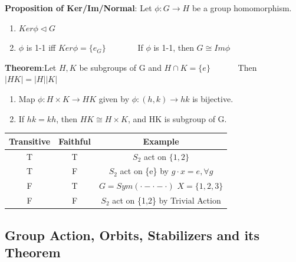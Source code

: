 \documentclass[11pt]{article}
\begin{document}
\begin{minipage}[t]{0.67\linewidth}

\textbf{Proposition of Ker/Im/Normal}: Let $\phi:G\to H$ be a group homomorphism.
\begin{enumerate}[itemsep=-2pt, topsep=-2pt]
    \item $Ker\phi\lhd G$
    \item $\phi$ is 1-1 iff $Ker\phi=\{e_G\}$ \ \ \ \ \ \ \ If $\phi$ is 1-1, then $G\cong Im\phi$
\end{enumerate}

\textbf{Theorem}:Let $H,K$ be subgroups of G and $H\cap K=\{e\}$ \ \ \ \ \ \ Then $|HK|=|H||K|$
\begin{enumerate}[itemsep=-2pt, topsep=-2pt]
    \item Map $\phi:H\times K\to HK$ given by $\phi:(h,k)\to hk$ is bijective.
    \item If $hk=kh$, then $HK\cong H\times K$, and HK is subgroup of G.
\end{enumerate}

\end{minipage}
\begin{minipage}[t]{0.33\linewidth}

\vspace{-2cm}
\begin{longtable}{c|c|c}
    {\footnotesize Transitive} & {\footnotesize Faithful} & {\footnotesize Example} \\
    \hline
    \hline
    T & T & {\footnotesize $S_2$ act on $\{1,2\}$} \\
    \hline
    T & F & \makecell{\footnotesize $S_2$ act on \{e\} \\ \footnotesize by $g\cdot x=e,\forall g$} \\
    \hline
    F & T & \makecell{\footnotesize $G=Sym(·-·-·)$ \\ \footnotesize $X=\{1,2,3\}$} \\
    \hline
    F & F & \makecell{\footnotesize $S_2$ act on \{1,2\} \\ \footnotesize by Trivial Action} \\
\end{longtable}

\end{minipage}

\subsection{Group Action, Orbits, Stabilizers and its Theorem}
\end{document}
